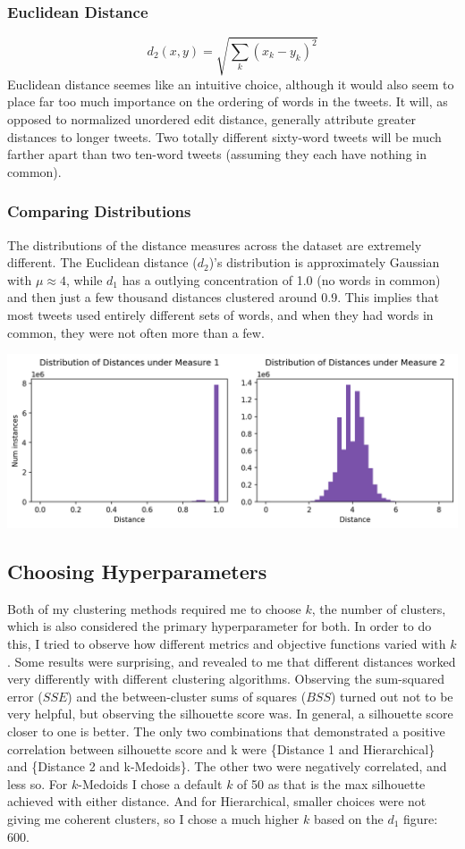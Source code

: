\documentclass[fleqn]{article}
\begin{document}
\subsubsection{Euclidean Distance}
$$d_{2}(x,y)=\sqrt{\sum_{k}(x_k-y_k)^{2}}$$
Euclidean distance seemes like an intuitive choice, although it would also seem to place far too much importance on the ordering of words in the tweets.  It will, as opposed to normalized unordered edit distance, generally attribute greater distances to longer tweets.  Two totally different sixty-word tweets will be much farther apart than two ten-word tweets (assuming they each have nothing in common).

\subsubsection{Comparing Distributions}
The distributions of the distance measures across the dataset are extremely different.  The Euclidean distance ($d_{2}$)'s distribution is approximately Gaussian with $\mu \approx 4$, while $d_{1}$ has a outlying concentration of 1.0 (no words in common) and then just a few thousand distances clustered around 0.9.  This implies that most tweets used entirely different sets of words, and when they had words in common, they were not often more than a few.
\begin{center}
	\includegraphics[scale=0.50]{images/distance_distributions_horizontal.png}
\end{center}

\subsection{Choosing Hyperparameters}
Both of my clustering methods required me to choose $k$, the number of clusters, which is also considered the primary hyperparameter for both.  In order to do this, I tried to observe how different metrics and objective functions varied with $k$.  Some results were surprising, and revealed to me that different distances worked very differently with different clustering algorithms.  Observing the sum-squared error ($SSE$) and the between-cluster sums of squares ($BSS$) turned out not to be very helpful, but observing the silhouette score was.  In general, a silhouette score closer to one is better.  The only two combinations that demonstrated a positive correlation between silhouette score and k were \{Distance 1 and Hierarchical\} and \{Distance 2 and k-Medoids\}. The other two were negatively correlated, and less so.  For $k$-Medoids I chose a default $k$ of 50 as that is the max silhouette achieved with either distance.  And for Hierarchical, smaller choices were not giving me coherent clusters, so I chose a much higher $k$ based on the $d_1$ figure: 600.
\end{document}
